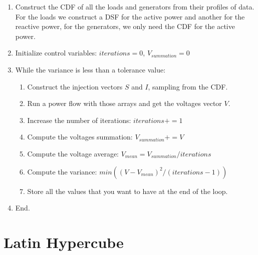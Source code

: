 \documentclass[a4paper,twoside,fleqn]{tufte-book}
\begin{document}
\begin{enumerate}
	\item Construct the CDF of all the loads and generators from their profiles of data. For the loads we construct a DSF for the active power and another for the reactive power, for the generators, we only need the CDF for the active power.
	
	\item Initialize control variables: $iterations = 0$, $V_{summation} = 0$
	
	\item While the variance is less than a tolerance value:
	
	\begin{enumerate}
		\item Construct the injection vectors $S$ and $I$, sampling from the CDF.
		
		\item Run a power flow with those arrays and get the voltages vector $V$.
		
		\item Increase the number of iterations: $iterations += 1$
		
		\item Compute the voltages summation: $V_{summation} += V$
		
		\item Compute the voltage average: $V_{mean} = V_{summation} / iterations$
		
		\item Compute the variance: $min((V - V_{mean})^2 / (iterations - 1))$
		
		\item Store all the values that you want to have at the end of the loop.
		
	\end{enumerate}

	\item End.
\end{enumerate}






\section{Latin Hypercube}




\end{document}
